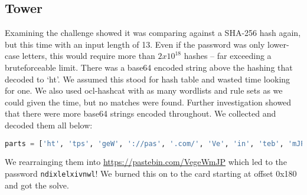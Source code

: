 \subsection{Tower}
Examining the challenge showed it was comparing against a SHA-256 hash again, but this time with an input length of 13. Even if the password was only lower-case letters, this would require more than $2 x 10^{18}$ hashes -- far exceeding a bruteforceable limit. There was a base64 encoded string above the hashing that decoded to `ht'. We assumed this stood for hash table and wasted time looking for one. We also used ocl-hashcat with as many wordlists and rule sets as we could given the time, but no matches were found. Further investigation showed that there were more base64 strings encoded throughout. We collected and decoded them all below:

\begin{lstlisting}[language=python]
parts = ['ht', 'tps', 'geW', '://pas', '.com/', 'Ve', 'in', 'teb', 'mJP']
\end{lstlisting}

We rearrainging them into \url{https://pastebin.com/VegeWmJP}
which led to the password \texttt{ndixlelxivnwl}! We burned this on to the card starting at offset 0x180 and got the solve.
